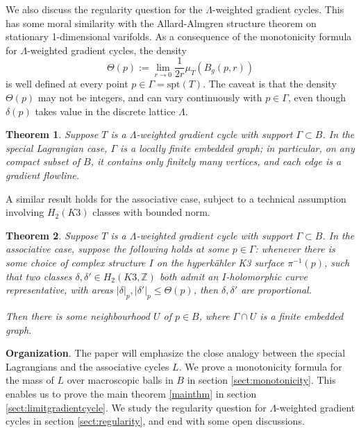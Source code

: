 \documentclass{article}
\newtheorem{thm}{Theorem}[section]
\theoremstyle{definition}
\newcommand{\Z}{\mathbb{Z}}
\begin{document}
		

		
		
		We also discuss the regularity question for the $\Lambda$-weighted gradient cycles. 
		This has some moral similarity with the Allard-Almgren structure theorem \cite{AllardAlmgren} on stationary 1-dimensional varifolds. As a consequence of the monotonicity formula for $\Lambda$-weighted gradient cycles, the density
		\[
		\Theta(p):= \lim_{r\to 0} \frac{1}{2r} \mu_T( B_g(p,r) )
		\]
		is well defined at every point $p\in \Gamma= \text{spt}(T)$. 
	The caveat is that the density $\Theta(p)$ may not be integers, and can vary continuously with $p\in \Gamma$, even though $\delta(p)$ takes value in the discrete lattice $\Lambda$. 
		
		
		
		\begin{thm}\label{thm:regularitySlag}
			Suppose $T$ is a $\Lambda$-weighted gradient cycle with support $\Gamma\subset B$.
		In the special Lagrangian case, $\Gamma$ is a \emph{locally finite embedded graph};  in particular, on any compact subset of $B$, it contains only finitely many vertices, and each edge is a gradient flowline.
		\end{thm}
		
		
		
		
		A similar result holds for the associative case, subject to a technical assumption involving $H_2(K3)$ classes with bounded norm.
		
		
		\begin{thm}\label{thm:regularityassociative}
			Suppose $T$ is a $\Lambda$-weighted gradient cycle with support $\Gamma\subset B$.
		In the associative case, suppose the following holds at some $p\in \Gamma$: whenever there is some choice of complex structure $I$ on the hyperk\"ahler K3 surface $\pi^{-1}(p)$, such that two classes $\delta, \delta'\in H_2(K3,\Z)$ both admit an $I$-holomorphic curve representative, with areas $|\delta|_p, |\delta'|_p \leq \Theta(p)$, then $\delta, \delta'$ are proportional.
		
		
		Then there is some neighbourhood $U$ of $p\in B$, where $\Gamma\cap U$ is a finite embedded graph.
		
		
		

		\end{thm}
		
		
		

		
		
		\textbf{Organization}.  The paper will emphasize the close analogy between the special Lagrangians and the associative cycles $L$. We prove a monotonicity formula for the mass of $L$ over macroscopic balls in $B$ in section \ref{sect:monotonicity}.  This enables us to prove the main theorem \ref{mainthm} in section \ref{sect:limitgradientcycle}. We study the regularity question for $\Lambda$-weighted gradient cycles in section \ref{sect:regularity}, and end with some open discussions.
		
\end{document}
